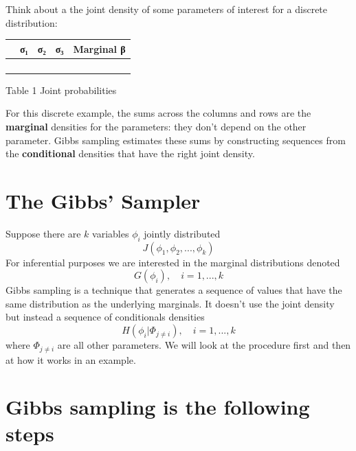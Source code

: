 \documentclass[
  letterpaper,
]{book}
\begin{document}
Think about a the joint density of some parameters of interest for a
discrete distribution:

\begin{table}
\centering
\begin{tabular}{>{}l|>{}c|>{}c|>{}c|>{}c}
\hline
  & σ₁ & σ₂ & σ₃ & Marginal β\\
\hline
\cellcolor{white}{β₁} & \cellcolor{pink}{0.10} & \cellcolor{pink}{0.20} & \cellcolor{pink}{0.30} & \cellcolor{wheat}{0.6}\\
\hline
\cellcolor{white}{β₂} & \cellcolor{pink}{0.10} & \cellcolor{pink}{0.05} & \cellcolor{pink}{0.05} & \cellcolor{wheat}{0.2}\\
\hline
\cellcolor{white}{β₃} & \cellcolor{pink}{0.05} & \cellcolor{pink}{0.10} & \cellcolor{pink}{0.05} & \cellcolor{wheat}{0.2}\\
\hline
\cellcolor{white}{Marginal σ} & \cellcolor{wheat}{0.25} & \cellcolor{wheat}{0.35} & \cellcolor{wheat}{0.40} & \cellcolor{wheat}{1.0}\\
\hline
\end{tabular}
\end{table}

Table 1 Joint probabilities

For this discrete example, the sums across the columns and rows are the
\textbf{marginal} densities for the parameters: they don't depend on the
other parameter. Gibbs sampling estimates these sums by constructing
sequences from the \textbf{conditional} densities that have the right
joint density.

\hypertarget{the-gibbs-sampler}{%
\section{The Gibbs' Sampler}\label{the-gibbs-sampler}}

Suppose there are \(k\) variables \(\phi_i\) jointly distributed \[
   J(\phi_1,\phi_2,...,\phi_k)
\] For inferential purposes we are interested in the marginal
distributions denoted \[
    G(\phi_i),\quad i=1,...,k
\] Gibbs sampling is a technique that generates a sequence of values
that have the same distribution as the underlying marginals. It doesn't
use the joint density but instead a sequence of conditionals densities
\[
    H(\phi_i|\Phi_{j\ne i}),\quad i=1,...,k
\] where \(\Phi_{j\ne i}\) are all other parameters. We will look at the
procedure first and then at how it works in an example.

\hypertarget{gibbs-sampling-is-the-following-steps}{%
\section{Gibbs sampling is the following
steps}\label{gibbs-sampling-is-the-following-steps}}
\end{document}
